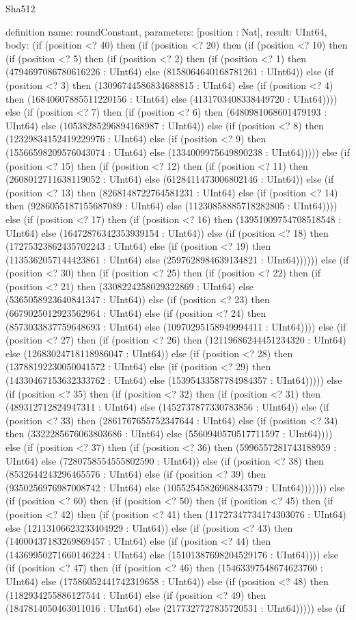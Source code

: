 \begin{lexlean}{Sha512}
\begin{semanticmodule}
definition{
  name: roundConstant,
  parameters: [position : Nat],
  result: UInt64,
  body: (if (position <? 40) then (if (position <? 20) then (if (position <? 10) then (if (position <? 5) then (if (position <? 2) then (if (position <? 1) then (4794697086780616226 : UInt64) else (8158064640168781261 : UInt64)) else (if (position <? 3) then (13096744586834688815 : UInt64) else (if (position <? 4) then (16840607885511220156 : UInt64) else (4131703408338449720 : UInt64)))) else (if (position <? 7) then (if (position <? 6) then (6480981068601479193 : UInt64) else (10538285296894168987 : UInt64)) else (if (position <? 8) then (12329834152419229976 : UInt64) else (if (position <? 9) then (15566598209576043074 : UInt64) else (1334009975649890238 : UInt64))))) else (if (position <? 15) then (if (position <? 12) then (if (position <? 11) then (2608012711638119052 : UInt64) else (6128411473006802146 : UInt64)) else (if (position <? 13) then (8268148722764581231 : UInt64) else (if (position <? 14) then (9286055187155687089 : UInt64) else (11230858885718282805 : UInt64)))) else (if (position <? 17) then (if (position <? 16) then (13951009754708518548 : UInt64) else (16472876342353939154 : UInt64)) else (if (position <? 18) then (17275323862435702243 : UInt64) else (if (position <? 19) then (1135362057144423861 : UInt64) else (2597628984639134821 : UInt64)))))) else (if (position <? 30) then (if (position <? 25) then (if (position <? 22) then (if (position <? 21) then (3308224258029322869 : UInt64) else (5365058923640841347 : UInt64)) else (if (position <? 23) then (6679025012923562964 : UInt64) else (if (position <? 24) then (8573033837759648693 : UInt64) else (10970295158949994411 : UInt64)))) else (if (position <? 27) then (if (position <? 26) then (12119686244451234320 : UInt64) else (12683024718118986047 : UInt64)) else (if (position <? 28) then (13788192230050041572 : UInt64) else (if (position <? 29) then (14330467153632333762 : UInt64) else (15395433587784984357 : UInt64))))) else (if (position <? 35) then (if (position <? 32) then (if (position <? 31) then (489312712824947311 : UInt64) else (1452737877330783856 : UInt64)) else (if (position <? 33) then (2861767655752347644 : UInt64) else (if (position <? 34) then (3322285676063803686 : UInt64) else (5560940570517711597 : UInt64)))) else (if (position <? 37) then (if (position <? 36) then (5996557281743188959 : UInt64) else (7280758554555802590 : UInt64)) else (if (position <? 38) then (8532644243296465576 : UInt64) else (if (position <? 39) then (9350256976987008742 : UInt64) else (10552545826968843579 : UInt64))))))) else (if (position <? 60) then (if (position <? 50) then (if (position <? 45) then (if (position <? 42) then (if (position <? 41) then (11727347734174303076 : UInt64) else (12113106623233404929 : UInt64)) else (if (position <? 43) then (14000437183269869457 : UInt64) else (if (position <? 44) then (14369950271660146224 : UInt64) else (15101387698204529176 : UInt64)))) else (if (position <? 47) then (if (position <? 46) then (15463397548674623760 : UInt64) else (17586052441742319658 : UInt64)) else (if (position <? 48) then (1182934255886127544 : UInt64) else (if (position <? 49) then (1847814050463011016 : UInt64) else (2177327727835720531 : UInt64))))) else (if }
\end{semanticmodule}
\end{lexlean}
